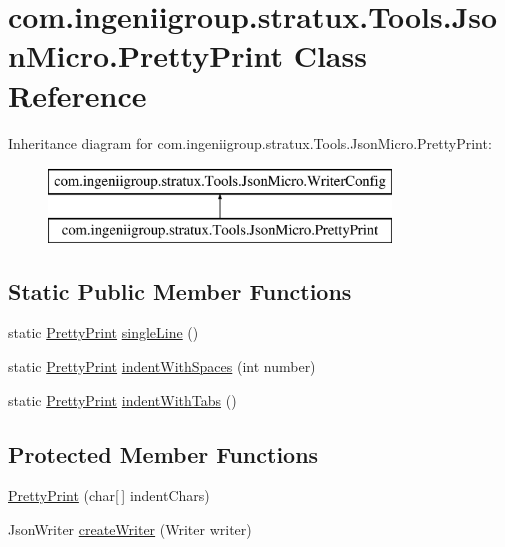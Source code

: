 \hypertarget{classcom_1_1ingeniigroup_1_1stratux_1_1_tools_1_1_json_micro_1_1_pretty_print}{}\section{com.\+ingeniigroup.\+stratux.\+Tools.\+Json\+Micro.\+Pretty\+Print Class Reference}
\label{classcom_1_1ingeniigroup_1_1stratux_1_1_tools_1_1_json_micro_1_1_pretty_print}
Inheritance diagram for com.\+ingeniigroup.\+stratux.\+Tools.\+Json\+Micro.\+Pretty\+Print\+:\begin{figure}[H]
\begin{center}
\leavevmode
\includegraphics[height=2.000000cm]{classcom_1_1ingeniigroup_1_1stratux_1_1_tools_1_1_json_micro_1_1_pretty_print}
\end{center}
\end{figure}
\subsection*{Static Public Member Functions}
\begin{DoxyCompactItemize}
\item 
static \hyperlink{classcom_1_1ingeniigroup_1_1stratux_1_1_tools_1_1_json_micro_1_1_pretty_print}{Pretty\+Print} \hyperlink{classcom_1_1ingeniigroup_1_1stratux_1_1_tools_1_1_json_micro_1_1_pretty_print_ac1ed501e1b091bd8f45030c1943ca60d}{single\+Line} ()
\item 
static \hyperlink{classcom_1_1ingeniigroup_1_1stratux_1_1_tools_1_1_json_micro_1_1_pretty_print}{Pretty\+Print} \hyperlink{classcom_1_1ingeniigroup_1_1stratux_1_1_tools_1_1_json_micro_1_1_pretty_print_a3a475018a91dd9eb940b4890b83ac4cf}{indent\+With\+Spaces} (int number)
\item 
static \hyperlink{classcom_1_1ingeniigroup_1_1stratux_1_1_tools_1_1_json_micro_1_1_pretty_print}{Pretty\+Print} \hyperlink{classcom_1_1ingeniigroup_1_1stratux_1_1_tools_1_1_json_micro_1_1_pretty_print_aa0ee49550fd71e94b0e51fdbf2ab1d6f}{indent\+With\+Tabs} ()
\end{DoxyCompactItemize}
\subsection*{Protected Member Functions}
\begin{DoxyCompactItemize}
\item 
\hyperlink{classcom_1_1ingeniigroup_1_1stratux_1_1_tools_1_1_json_micro_1_1_pretty_print_af92690905d36dc699f8ef746115c9f1e}{Pretty\+Print} (char\mbox{[}$\,$\mbox{]} indent\+Chars)
\item 
Json\+Writer \hyperlink{classcom_1_1ingeniigroup_1_1stratux_1_1_tools_1_1_json_micro_1_1_pretty_print_acc1cf990b8136b873eaeded8eb86fea9}{create\+Writer} (Writer writer)
\end{DoxyCompactItemize}
